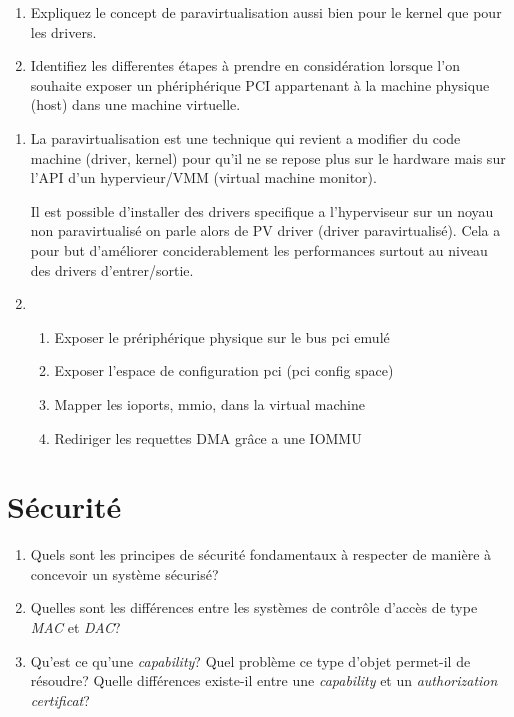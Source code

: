 \begin{enumerate}
  \item
        Expliquez le concept de paravirtualisation aussi bien pour le kernel
        que pour les drivers.
  \item 
        Identifiez les differentes \'etapes \`a prendre en consid\'eration
        lorsque l'on souhaite exposer un ph\'eriph\'erique PCI appartenant \`a la machine
        physique (host) dans une machine virtuelle.
\end{enumerate}

\begin{correction}

\begin{enumerate}
  \item
        La paravirtualisation est une technique qui revient a modifier du code
        machine (driver, kernel) pour qu'il ne se repose plus sur le hardware
        mais sur l'API d'un hypervieur/VMM (virtual machine monitor).

        Il est possible d'installer des drivers specifique a l'hyperviseur sur
        un noyau non paravirtualis\'e on parle alors de PV driver (driver
        paravirtualis\'e). Cela a pour but d'am\'eliorer conciderablement les
        performances surtout au niveau des drivers d'entrer/sortie.
  \item
       \begin{enumerate}
       \item Exposer le pr\'eriph\'erique physique sur le bus pci emul\'e
       \item Exposer l'espace de configuration pci (pci config space)
       \item Mapper les ioports, mmio, dans la virtual machine
       \item Rediriger les requettes DMA gr\^ace a une IOMMU
       \end{enumerate}
\end{enumerate}

\end{correction}

% 
%

\section{S\'ecurit\'e
         }

\begin{enumerate}
  \item
    Quels sont les principes de s\'ecurit\'e fondamentaux \`a respecter
    de mani\`ere \`a concevoir un syst\`eme s\'ecuris\'e?
  \item
    Quelles sont les diff\'erences entre les syst\`emes de contr\^ole d'acc\`es
    de type \textit{MAC} et \textit{DAC}?
  \item
    Qu'est ce qu'une \textit{capability}? Quel probl\`eme ce type d'objet
    permet-il de r\'esoudre? Quelle diff\'erences existe-il entre une
    \textit{capability} et un \textit{authorization certificat}?
\end{enumerate}

